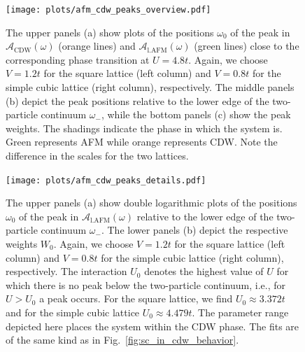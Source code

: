 \documentclass[
    reprint, 
    aps,
    preprintnumbers,
    twocolumn,
    prb,
    superscriptaddress
]{revtex4-2}
\newcommand{\spectral}[1]{\mathcal{A}_\text{#1}  (\omega)}
\begin{document}
\begin{figure}
    \centering
    \texttt{[image: plots/afm\_cdw\_peaks\_overview.pdf]}
    \caption{The upper panels (a) show plots of the positions $\omega_0$ of the peak in $\spectral{CDW}$ (orange lines) 
		and $\spectral{l.AFM}$ (green lines) close to the corresponding phase transition 
		at $U = 4.8t$.   Again, we choose $V=1.2t$ for the square lattice (left column) and $V=0.8t$ for the simple cubic lattice (right column), respectively.
    The middle panels (b) depict the peak positions relative to the lower edge of the two-particle continuum 
		$\omega_-$, while the bottom panels (c) show the peak weights.
    The shadings indicate the phase in which the system is. Green represents AFM while orange represents CDW.
    Note the difference in the scales for the two lattices.}
    \label{fig:afm_cdw_peaks_overview}
\end{figure}


\begin{figure}
    \centering
    \texttt{[image: plots/afm\_cdw\_peaks\_details.pdf]}
    \caption{The upper panels (a) show double logarithmic plots of the positions $\omega_0$ 
		of the peak in $\spectral{l.AFM}$ relative to the lower edge of the two-particle continuum $\omega_-$.
    The lower panels (b) depict the respective weights $W_0$.
    Again, we choose $V=1.2t$ for the square lattice (left column) and 
		$V=0.8t$ for the simple cubic lattice (right column), respectively.
    The interaction $U_0$ denotes the highest value of $U$ for which 
		there is no peak below the two-particle continuum, i.e., for $U> U_0$ a peak occurs.
    For the square lattice, we find $U_0 \approx 3.372t$ and for the simple cubic lattice $U_0 \approx 4.479t$.
    The parameter range depicted here places the system within the CDW phase.
    The fits are of the same kind as in Fig.\ \ref{fig:sc_in_cdw_behavior}.}
    \label{fig:afm_cdw_peaks_details}
\end{figure}


\end{document}
